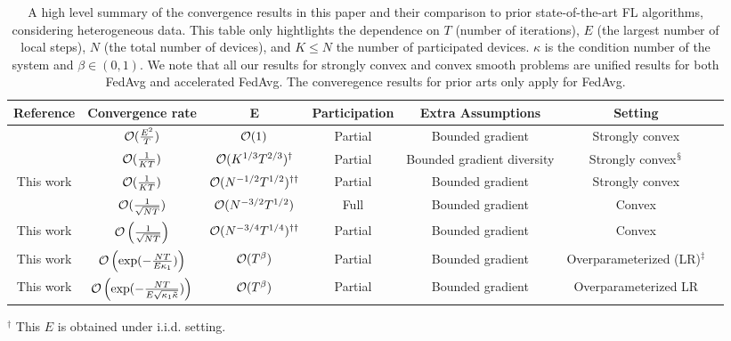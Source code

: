 \begin{table}[h!]
\centering
\hspace{-2em}
{\small
\begin{tabular}{|c|c|c|c|c|c|c|}
\hline Reference                 & Convergence rate    & E                           			& Participation & Extra Assumptions  		  & Setting  \\ \hline\hline 
\cite{li2019convergence}         & ${\mathcal{O}}(\frac{E^2}{T})$& ${\mathcal{O}}(1)$                    			& Partial       & Bounded gradient   		  & Strongly convex  \\ \hline
\cite{haddadpour2019convergence} & ${\mathcal{O}}(\frac{1}{KT})$ & ${\mathcal{O}}(K^{1/3}T^{2/3})^{\dagger}$     			& Partial       & Bounded gradient diversity   & Strongly convex$^{\mathsection}$  \\ \hline
This work                        & ${\mathcal{O}}(\frac{1}{KT})$ & ${\mathcal{O}}(N^{-1/2}T^{1/2})^{\dagger\dagger}$ 			& Partial       & Bounded gradient             & Strongly convex  \\\hline\hline
\cite{zanette2019tighter}  & ${\mathcal{O}}(\frac{1}{\sqrt{NT}})$ & ${\mathcal{O}}(N^{-3/2}T^{1/2})$     			& Full        & Bounded gradient             & Convex  \\\hline
This work      & ${\mathcal{O}}\left(\frac{1}{\sqrt{NT}}\right)$ &  ${\mathcal{O}}(N^{-3/4}T^{1/4})^{\dagger\dagger}$			& Partial     & Bounded gradient            &  Convex   \\ \hline\hline
This work & ${\mathcal{O}}\left(\exp(-\frac{NT}{E\kappa_1})\right)$ & $ {\mathcal{O}}(T^{\beta})$                   &  Partial     & Bounded gradient    & Overparameterized (LR)$^{\ddagger}$ \\ \hline
This work & ${\mathcal{O}}\left(\exp(-\frac{NT}{E\sqrt{\kappa_1\tilde{\kappa}}})\right)$ & $ {\mathcal{O}}(T^{\beta})$  &  Partial     & Bounded gradient    & Overparameterized LR \\ \hline
\end{tabular}
}
\caption{A high level summary of the convergence results in this paper and their comparison to prior state-of-the-art FL algorithms, considering heterogeneous data. This table only hightlights the
dependence on $T$ (number of iterations), $E$ (the largest number of local steps), $N$ (the total number of devices), and $K\leq N$ the number of participated devices. 
$\kappa$ is the condition number of the system and $\beta \in (0,1)$. 
We note that all our results for strongly convex and convex smooth problems are unified results for both FedAvg and accelerated FedAvg. The converegence results for prior arts only apply for FedAvg.}
{\raggedright 
         $^{\dagger}$ This $E$ is obtained under i.i.d. setting. \\
}
\end{table}
